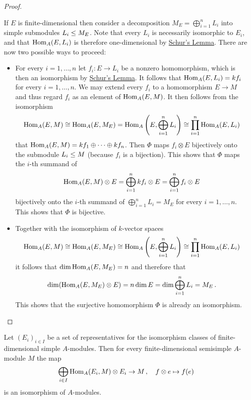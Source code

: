 \begin{proof}
\begin{enumerate}
      If $E$ is finite-dimensional then consider a decomposition $M_E = \bigoplus_{i=1}^n L_i$ into simple submodules $L_i \leq M_E$.
      Note that every $L_i$ is necessarily isomorphic to $E_i$, and that $\operatorname{Hom}_A(E,L_i)$ is therefore one-dimensional by \hyperref[proposition: schurs lemma for modules]{Schur’s Lemma}.
      There are now two possible ways to proceed:
      \begin{itemize}
        \item
          For every $i = 1, \dotsc, n$ let $f_i \colon E \to L_i$ be a nonzero homomorphism, which is then an isomorphism by \hyperref[proposition: schurs lemma for modules]{Schur’s Lemma}.
          It follows that $\operatorname{Hom}_A(E,L_i) = k f_i$ for every $i = 1, \dotsc, n$.
          We may extend every $f_i$ to a homomorphism $E \to M$ and thus regard $f_i$ as an element of $\operatorname{Hom}_A(E,M)$.
          It then follows from the isomorphism
          \[
                  \operatorname{Hom}_A(E,M)
            \cong \operatorname{Hom}_A(E,M_E)
            =     \operatorname{Hom}_A\left( E, \bigoplus_{i=1}^n L_i \right)
            \cong \prod_{i=1}^n \operatorname{Hom}_A( E, L_i )
          \]
          that $\operatorname{Hom}_A(E, M) = k f_1 \oplus \dotsb \oplus k f_n$.
          Then $\Phi$ maps $f_i \otimes E$ bijectively onto the submodule $L_i \leq M$ (because $f_i$ is a bijection).
          This shows that $\Phi$ maps the $i$-th summand of
          \[
              \operatorname{Hom}_A(E, M) \otimes E
            = \bigoplus_{i=1}^n k f_i \otimes E
            = \bigoplus_{i=1}^n f_i \otimes E
          \]
          bijectively onto the $i$-th summand of $\bigoplus_{i=1}^n L_i = M_E$ for every $i = 1, \dotsc, n$.
          This shows that $\Phi$ is bijective.
        \item
          Together with the isomorphism of $k$-vector spaces
          \[
                  \operatorname{Hom}_A(E,M)
            \cong \operatorname{Hom}_A(E,M_E)
            \cong \operatorname{Hom}_A\left( E, \bigoplus_{i=1}^n L_i \right)
            \cong \prod_{i=1}^n \operatorname{Hom}_A( E, L_i )
          \]
          it follows that $\dim \operatorname{Hom}_A(E,M_E) = n$ and therefore that
          \[
              \dim (\operatorname{Hom}_A(E,M_E) \otimes E)
            = n \dim E
            = \dim \bigoplus_{i=1}^n L_i
            = M_E \,.
          \]
          This shows that the surjective homomorphism $\Phi$ is already an isomorphism.
        \qedhere
      \end{itemize}
  \end{enumerate}
\end{proof}


\begin{corollary}
  Let $(E_i)_{i \in I}$ be a set of representatives for the isomorphism classes of finite-dimensional simple $A$-modules.
  Then for every finite-dimensional semisimple $A$-module $M$ the map
  \[
            \bigoplus_{i \in I} \operatorname{Hom}_A(E_i, M) \otimes E_i
    \to     M \,,
    \quad   f \otimes e
    \mapsto f(e)
  \]
  is an isomorphism of $A$-modules.
\end{corollary}






